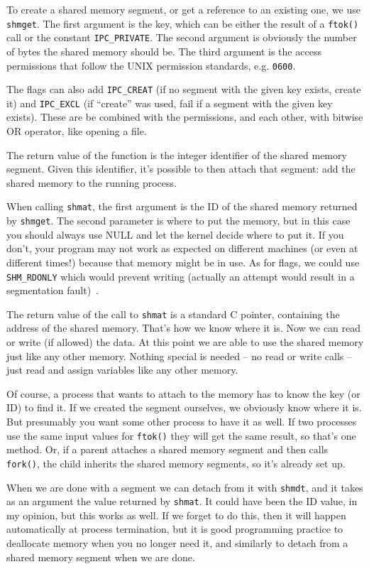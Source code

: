 To create a shared memory segment, or get a reference to an existing one, we use \texttt{shmget}. The first argument is the key, which can be either the result of a \texttt{ftok()} call or the constant \texttt{IPC\_PRIVATE}. The second argument is obviously the number of bytes the shared memory should be. The third argument is the access permissions that follow the UNIX permission standards, e.g. \texttt{0600}.

The flags can also add \texttt{IPC\_CREAT} (if no segment with the given key exists, create it) and \texttt{IPC\_EXCL} (if ``create'' was used, fail if a segment with the given key exists). These are be combined with the permissions, and each other, with bitwise OR operator, like opening a file.

The return value of the function is the integer identifier of the shared memory segment. Given this identifier, it's possible to then attach that segment: add the shared memory to the running process.

When calling \texttt{shmat}, the first argument is the ID of the shared memory returned by \texttt{shmget}. The second parameter is where to put the memory, but in this case you should always use NULL and let the kernel decide where to put it. If you don't, your program may not work as expected on different machines (or even at different times!) because that memory might be in use. As for flags, we could use \texttt{SHM\_RDONLY} which would prevent writing (actually an attempt would result in a segmentation fault)~\cite{lpi}.

The return value of the call to \texttt{shmat} is a standard C pointer, containing the address of the shared memory. That's how we know where it is. Now we can read or write (if allowed) the data. At this point we are able to use the shared memory just like any other memory. Nothing special is needed -- no read or write calls -- just read and assign variables like any other memory.

Of course, a process that wants to attach to the memory has to know the key (or ID) to find it. If we created the segment ourselves, we obviously know where it is. But presumably you want some other process to have it as well. If two processes use the same input values for \texttt{ftok()} they will get the same result, so that's one method. Or, if a parent attaches a shared memory segment and then calls \texttt{fork()}, the child inherits the shared memory segments, so it's already set up.

When we are done with a segment we can detach from it with \texttt{shmdt}, and it takes as an argument the value returned by \texttt{shmat}. It could have been the ID value, in my opinion, but this works as well. If we forget to do this, then it will happen automatically at process termination, but it is good programming practice to deallocate memory when you no longer need it, and similarly to detach from a shared memory segment when we are done.

